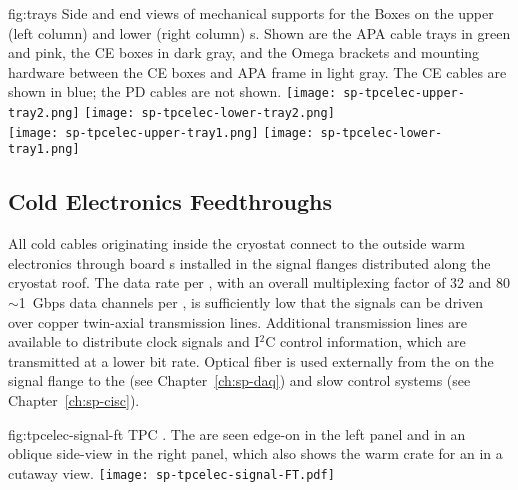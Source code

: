 \begin{dunefigure}
{fig:trays}
{Side and end views of mechanical supports for the  Boxes on the upper (left column) and lower (right column) s. Shown are the APA cable trays in green and pink, the CE boxes in dark gray, and the Omega brackets and mounting hardware between the CE boxes and APA frame in light gray.  The CE cables are shown in blue; the PD cables are not shown.}
\texttt{[image: sp-tpcelec-upper-tray2.png]}
\hspace{5mm}
\texttt{[image: sp-tpcelec-lower-tray2.png]} \\
\texttt{[image: sp-tpcelec-upper-tray1.png]}
\hspace{5mm}
\texttt{[image: sp-tpcelec-lower-tray1.png]}
\end{dunefigure}

\subsection{Cold Electronics Feedthroughs}
\label{sec:fdsp-tpcelec-design-ft}

All cold cables originating inside the cryostat connect to the outside warm electronics through  board \fdth{}s
installed in the signal flanges distributed along the cryostat roof.
The  data rate per , with an overall multiplexing factor of 32 and 80 $\sim$1~Gbps data channels per ,
is sufficiently low that the  signals can be driven over copper twin-axial transmission lines.
Additional transmission lines are available to distribute  clock signals and I$^2$C control information,
which are transmitted at a lower bit rate.
Optical fiber is used externally from the  on the signal flange to the  (see Chapter~\ref{ch:sp-daq}) and slow control systems (see Chapter~\ref{ch:sp-cisc}).

\begin{dunefigure}
{fig:tpcelec-signal-ft}
{TPC  \fdth. The  are seen edge-on in the left panel and in an oblique side-view in the right panel, which also shows the warm crate for an  %
in a cutaway view.}
\texttt{[image: sp-tpcelec-signal-FT.pdf]}
\end{dunefigure}


